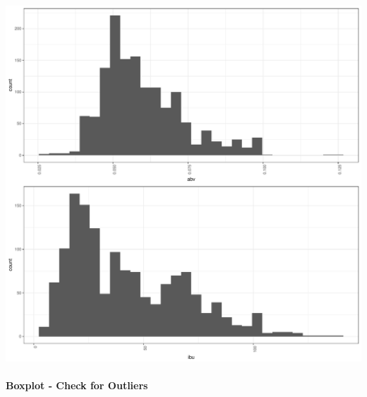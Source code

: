 \documentclass[]{article}
\let\oldparagraph\paragraph
\renewcommand{\paragraph}[1]{\oldparagraph{#1}\mbox{}}
\begin{document}
\begin{center}\includegraphics{Analysis_Final_files/figure-latex/unnamed-chunk-25-1} \end{center}

\paragraph{Boxplot - Check for
Outliers}\label{boxplot---check-for-outliers}
\end{document}
